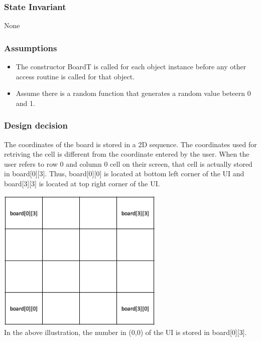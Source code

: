 \documentclass[12pt]{article}
\begin{document}
\subsubsection* {State Invariant}

None

\subsubsection* {Assumptions}

\begin{itemize}
  \item The constructor BoardT is called for each object instance before any other access routine 
  is called for that object. 
  \item Assume there is a random function that generates a random value beteern 0 and 1.
\end{itemize}

\subsubsection* {Design decision}

The coordinates of the board is stored in a 2D sequence. The coordinates used for retriving the cell is different
from the coordinate entered by the user. When the user refers to row 0 and column 0 cell 
on their screen, that cell is actually stored in board[0][3]. Thus, board[0][0] is located at bottom left corner of the UI 
and board[3][3] is located at top right corner of the UI.

\begin{center}
  \includegraphics[width=0.6\textwidth]{board.png} \\
  In the above illustration, the number in (0,0) of the UI is stored in board[0][3].
\end{center}
\end{document}
